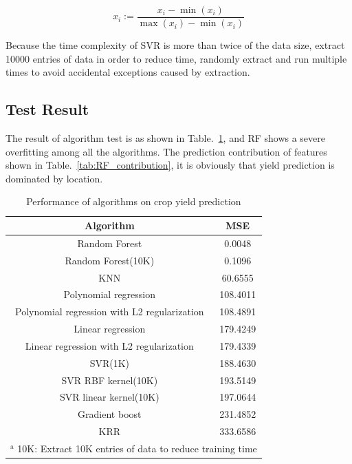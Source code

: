 \documentclass[conference]{IEEEtran}
\begin{document}
\begin{equation}
  x_i := \frac{x_i-\min \left( x_i \right)}{\max \left( x_i \right) -\min \left( x_i \right)}
\label{eq:standarlize}
\end{equation}

Because the time complexity of SVR is more than twice of the data size\cite{clarke2005analysis}, extract 10000 entries of data in order to reduce time, randomly extract and run multiple times to avoid accidental exceptions caused by extraction.



\subsection{Test Result}
The result of algorithm test is as shown in Table.~\ref{tab:result}, and RF shows a severe overfitting among all the algorithms. The prediction contribution of features shown in Table.~\ref{tab:RF_contribution}, it is obviously that yield prediction is dominated by location.

\begin{table}[htbp]
  \caption{Performance of algorithms on crop yield prediction}
  \begin{center}
  \begin{tabular}{|c|c|}
  \hline
  Algorithm                                    & MSE      \\
  \hline
  Random Forest                                & 0.0048   \\
  Random Forest(10K)                           & 0.1096   \\
  KNN                                          & 60.6555  \\
  Polynomial regression                        & 108.4011 \\
  Polynomial regression with L2 regularization & 108.4891 \\
  Linear regression                            & 179.4249 \\
  Linear regression with L2 regularization     & 179.4339 \\
  SVR(1K)                                      & 188.4630 \\
  SVR RBF kernel(10K)                          & 193.5149 \\
  SVR linear kernel(10K)                       & 197.0644 \\
  Gradient boost                               & 231.4852 \\
  KRR                                          & 333.6586 \\
  \hline
  \multicolumn{2}{l}{$^{\mathrm{a}}$ 10K: Extract 10K entries of data to reduce training time} \\
  \end{tabular}
  \label{tab:result}
  \end{center}
\end{table}
\end{document}
